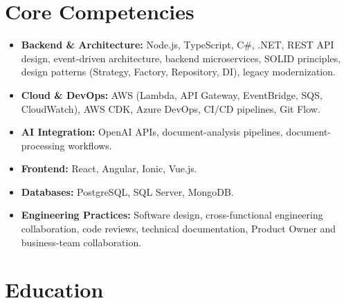 \documentclass[11pt,a4paper,sans]{moderncv}
\begin{document}
\vspace{3pt}

\section{Core Competencies}
\vspace{1pt}
\begin{itemize}
\item \textbf{Backend \& Architecture:} Node.js, TypeScript, C\#, .NET, REST API design, event-driven
architecture, backend microservices, SOLID principles, design patterns (Strategy, Factory,
Repository, DI), legacy modernization.
\item \textbf{Cloud \& DevOps:} AWS (Lambda, API Gateway, EventBridge, SQS, CloudWatch), AWS CDK,
Azure DevOps, CI/CD pipelines, Git Flow.
\item \textbf{AI Integration:} OpenAI APIs, document-analysis pipelines, document-processing workflows.
\item \textbf{Frontend:} React, Angular, Ionic, Vue.js.
\item \textbf{Databases:} PostgreSQL, SQL Server, MongoDB.
\item \textbf{Engineering Practices:} Software design, cross-functional engineering collaboration, code
reviews, technical documentation, Product Owner and business-team collaboration.
\end{itemize}

\section{Education}
\vspace{1pt}
\end{document}
